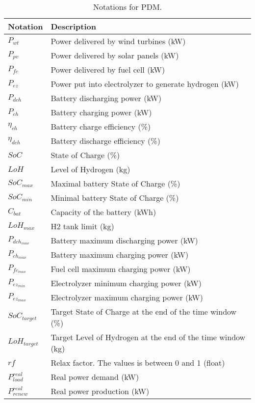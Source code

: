 \begin{table*}[!htb]
\centering
\caption{Notations for PDM.}
\label{tab:notation_power}
\begin{tabular}{l|l}
    \hline
    Notation & Description \\\hline\hline
    $P_{wt}$ & Power delivered by wind turbines (kW)\\
    $P_{pv}$ & Power delivered by solar panels (kW)\\
    $P_{fc}$ & Power delivered by fuel cell (kW)\\
    $P_{ez}$ & Power put into electrolyzer to generate hydrogen (kW)\\
    $P_{dch}$ & Battery discharging power (kW)\\
    $P_{ch}$ & Battery charging power (kW)\\
    $\eta_{ch}$ & Battery charge efficiency (\%)\\
    $\eta_{dch}$ & Battery discharge efficiency (\%)\\
    $SoC$ & State of Charge (\%)\\
    $LoH$ & Level of Hydrogen (kg)\\
    $SoC_{max}$ & Maximal battery State of Charge (\%)\\
    $SoC_{min}$ & Minimal battery State of Charge (\%)\\
    $C_{bat}$ & Capacity of the battery (kWh)\\
    $LoH_{max}$ & H2 tank limit (kg)\\
    $P_{dch_{max}}$ & Battery maximum discharging power (kW)\\
    $P_{ch_{max}}$ & Battery maximum charging power (kW)\\
    $P_{fc_{max}}$ & Fuel cell maximum charging power (kW)\\
    $P_{ez_{min}}$ & Electrolyzer minimum charging power (kW)\\
    $P_{ez_{max}}$ & Electrolyzer maximum charging power (kW)\\
    $SoC_{target}$ & Target State of Charge at the end of the time window (\%)\\
    $LoH_{target}$ & Target Level of Hydrogen at the end of the time window (kg)\\
    $rf$ & Relax factor. The values is between 0 and 1 (float) \\
    $P^{real}_{load}$ & Real power demand (kW)\\
    $P^{real}_{renew}$ & Real power production (kW)\\
    \hline
\end{tabular}
\end{table*}